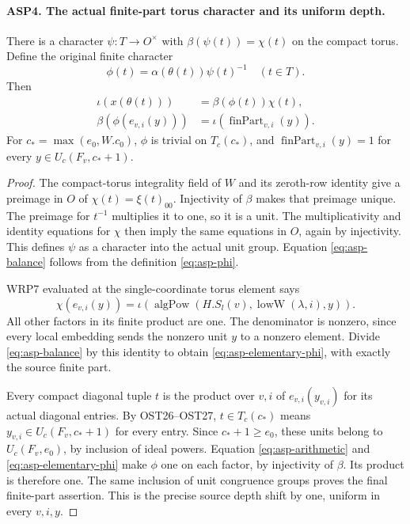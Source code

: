 \documentclass[11pt,a4paper]{article}
\numberwithin{equation}{section}
\theoremstyle{remark}\newtheorem{remark}[theorem]{Remark}
\begin{document}
\paragraph{ASP4. The actual finite-part torus character and its uniform depth.}
\label{claim:ASP4}
There is a character $\psi:T\to O^\times$ with
$\beta(\psi(t))=\chi(t)$ on the compact torus.
Define the original finite character
\begin{equation}\label{eq:asp-phi}
          \phi(t)=\alpha(\theta(t))\psi(t)^{-1}
                              \quad(t\in T).
\end{equation}
Then
\begin{align}
 \iota(x(\theta(t)))&=\beta(\phi(t))\chi(t),
                                       \label{eq:asp-balance}\\
 \beta(\phi(e_{v,\allowbreak{} i}(y)))&=
                             \iota(\operatorname{finPart}_{v,\allowbreak{} i}(y)).
                                       \label{eq:asp-elementary-phi}
\end{align}
For $c_* =\max(e_0,\allowbreak{} W.c_0)$, $\phi$ is trivial on
$T_c(c_*)$, and
$\operatorname{finPart}_{v,\allowbreak{} i}(y)=1$ for every
$y\in U_c(F_v,\allowbreak{} c_*+1)$.
\begin{proof}
The compact-torus integrality field of $W$ and
its zeroth-row identity give a preimage in $O$
of $\chi(t)=\xi(t)_{00}$.  Injectivity of $\beta$
makes that preimage unique.  The preimage for
$t^{-1}$ multiplies it to one, so it is a unit.
The multiplicativity and identity equations for
$\chi$ then imply the same equations in $O$,
again by injectivity.  This defines $\psi$ as
a character into the actual unit group.  Equation
\eqref{eq:asp-balance} follows from the definition
\eqref{eq:asp-phi}.

WRP7 evaluated at the single-coordinate torus
element says
\[
 \chi(e_{v,\allowbreak{} i}(y))=
       \iota(\operatorname{algPow}(H.S_l(v),
                              \operatorname{lowW}(\lambda,\allowbreak{} i),\allowbreak{} y)).
\]
All other factors in its finite product are one.
The denominator is nonzero, since every local
embedding sends the nonzero unit $y$ to a nonzero
element.  Divide \eqref{eq:asp-balance} by this
identity to obtain \eqref{eq:asp-elementary-phi},
with exactly the source finite part.

Every compact diagonal tuple $t$ is the product
over $v,\allowbreak{} i$ of $e_{v,\allowbreak{} i}(y_{v,\allowbreak{} i})$ for its actual
diagonal entries.  By OST26--OST27,
$t\in T_c(c_*)$ means
$y_{v,\allowbreak{} i}\in U_c(F_v,\allowbreak{} c_*+1)$ for every entry.
Since $c_*+1\geq e_0$, these units belong to
$U_c(F_v,\allowbreak{} e_0)$, by inclusion of ideal powers.
Equation \eqref{eq:asp-arithmetic} and
\eqref{eq:asp-elementary-phi} make $\phi$ one
on each factor, by injectivity of $\beta$.
Its product is therefore one.  The same inclusion
of unit congruence groups proves the final
finite-part assertion.  This is the precise
source depth shift by one, uniform in every
$v,\allowbreak{} i,\allowbreak{} y$.
\end{proof}
\end{document}
